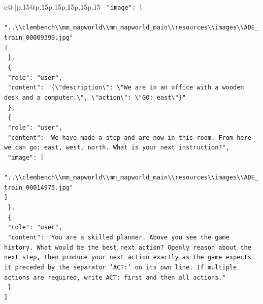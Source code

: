 \documentclass{article}
\begin{document}
{\begin{supertabular}{c@{$\;$}|p{.15\linewidth}@{}p{.15\linewidth}p{.15\linewidth}p{.15\linewidth}p{.15\linewidth}p{.15\linewidth}}
{{{\texttt{    "image": {[}} \\
\texttt{      "..\textbackslash{}\textbackslash{}clembench\textbackslash{}\textbackslash{}mm\_mapworld\textbackslash{}\textbackslash{}mm\_mapworld\_main\textbackslash{}\textbackslash{}resources\textbackslash{}\textbackslash{}images\textbackslash{}\textbackslash{}ADE\_train\_00009399.jpg"} \\
\texttt{    {]}} \\
\texttt{  \},} \\
\texttt{  \{} \\
\texttt{    "role": "user",} \\
\texttt{    "content": "\{\textbackslash{}"description\textbackslash{}": \textbackslash{}"We are in an office with a wooden desk and a computer.\textbackslash{}", \textbackslash{}"action\textbackslash{}": \textbackslash{}"GO: east\textbackslash{}"\}"} \\
\texttt{  \},} \\
\texttt{  \{} \\
\texttt{    "role": "user",} \\
\texttt{    "content": "We have made a step and are now in this room. From here we can go: east, west, north. What is your next instruction?",} \\
\texttt{    "image": {[}} \\
\texttt{      "..\textbackslash{}\textbackslash{}clembench\textbackslash{}\textbackslash{}mm\_mapworld\textbackslash{}\textbackslash{}mm\_mapworld\_main\textbackslash{}\textbackslash{}resources\textbackslash{}\textbackslash{}images\textbackslash{}\textbackslash{}ADE\_train\_00014975.jpg"} \\
\texttt{    {]}} \\
\texttt{  \},} \\
\texttt{  \{} \\
\texttt{    "role": "user",} \\
\texttt{    "content": "You are a skilled planner. Above you see the game history. What would be the best next action? Openly reason about the next step, then produce your next action exactly as the game expects it preceded by the separator 'ACT:' on its own line. If multiple actions are required, write ACT: first and then all actions."} \\
\texttt{  \}} \\
\texttt{{]}} \\
            }
        }
    }
     \\ \\


\end{supertabular}}
\end{document}
